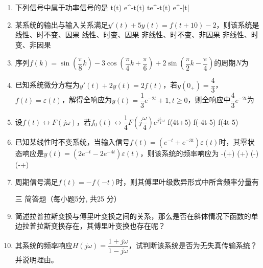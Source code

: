 \documentclass[11pt]{ctexart}
\begin{document}
\begin{enumerate}[leftmargin=0em]
\begin{center}
{图1}
\end{center}
\item 下列信号中属于功率信号的是
\xxs%
{\cos t\varepsilon(t)}%
{e^{-t}\varepsilon(t)}%
{te^{-t}\varepsilon(t)}%
{e^{-|t|}}
\item 某系统的输出与输入关系满足$y'(t)+5y(t)=f(t+10)-2$，则该系统是
\xx%
{线性、时不变、因果}%
{线性、时变、因果}%
{非线性、时不变、非因果}%
{非线性、时变、非因果}
\item 序列$f(k)=\sin\left(\dfrac{\pi}{8}k\right)-3\cos\left(\dfrac{\pi}{4}k+\dfrac{\pi}{6}\right)+2\sin\left(\dfrac{\pi}{2}k-\dfrac{\pi}{4}\right)$的周期$N$为

\item 已知系统微分方程为$y'(t)+2y(t)=2f(t)$，若$y(0_+)=\dfrac{4}{3}$，$f(t)=\varepsilon(t)$，解得全响应为$y(t)=\dfrac{1}{3}e^{-2t}+1,t\geqslant 0$，则全响应中$\dfrac{4}{3}e^{-2t}$为
\item 设$f(t)\leftrightarrow F(j\omega)$，若$f_0(t)\leftrightarrow \dfrac{1}{4}F\left(j\dfrac{\omega}{4}\right)e^{j\frac{5}{4}\omega}$
%
{f(4t+5)}%
{f(-4t-5)}%
{f(4t-5)}
\newpage
\vspace{3em}
\item  已知某线性时不变系统，当输入信号$f(t)=(e^{-t}+e^{-3t})\varepsilon(t)$时，其零状态响应是$y(t)=(2e^{-t}-2e^{-4t})\varepsilon(t)$，则该系统的频率响应为
\xxs
{-\left(+\right)}
{\left(+\right)}
{\left(-\right)}
{\left(-+\right)}
\vspace*{3em}
\item 周期信号满足$f(t)=-f(-t)$时，则其傅里叶级数异形式中所含频率分量有
\vspace{3em}\setlength{\itemsep}{0em}\setcounter{enumi}{0}
\item[\kaishu{}三]{\kaishu{}简答题（每小题5分, 共25 分）}%
\item 简述拉普拉斯变换与傅里叶变换之间的关系，那么是否在斜体情况下函数的单边拉普拉斯变换存在，其傅里叶变换也存在呢？\setlength{\itemsep}{8em}
\item 其系统的频率响应$H(j\omega)=\dfrac{1+j\omega}{1-j\omega}$，试判断该系统是否为无失真传输系统？并说明理由。

\end{enumerate}
\end{document}
